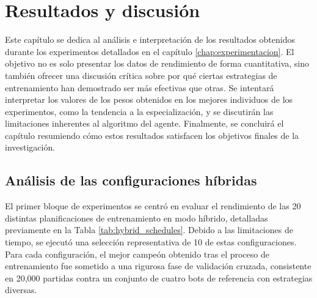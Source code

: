 \chapter{Resultados y discusión} \label{chap:resultados}

Este capítulo se dedica al análisis e interpretación de los resultados obtenidos durante los experimentos detallados en el capítulo \ref{chap:experimentacion}. El objetivo no es solo presentar los datos de rendimiento de forma cuantitativa, sino también ofrecer una discusión crítica sobre por qué ciertas estrategias de entrenamiento han demostrado ser más efectivas que otras. Se intentará interpretar los valores de los pesos obtenidos en los mejores individuos de los experimentos, como la tendencia a la especialización, y se discutirán las limitaciones inherentes al algoritmo del agente. Finalmente, se concluirá el capítulo resumiendo cómo estos resultados satisfacen los objetivos finales de la investigación.

\section{Análisis de las configuraciones híbridas} \label{sec:analisis_configuraciones_hibridas}

El primer bloque de experimentos se centró en evaluar el rendimiento de las 20 distintas planificaciones de entrenamiento en modo híbrido, detalladas previamente en la Tabla \ref{tab:hybrid_schedules}. Debido a las limitaciones de tiempo, se ejecutó una selección representativa de 10 de estas configuraciones. Para cada configuración, el mejor campeón obtenido tras el proceso de entrenamiento fue sometido a una rigurosa fase de validación cruzada, consistente en 20,000 partidas contra un conjunto de cuatro bots de referencia con estrategias diversas.

